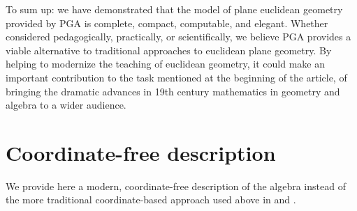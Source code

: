 \documentclass{birkjour}
\newcommand{\fvsh}[2]{\ifthenelse{\equal{\isFV}{true}}{#1}{#2}}
\begin{document}
To sum up:  we have demonstrated that the model of plane euclidean geometry provided by PGA is complete, compact, computable, and elegant.  Whether considered pedagogically, practically, or scientifically, we believe PGA provides a viable alternative to traditional approaches to euclidean plane geometry.   By helping to modernize the teaching of euclidean geometry, it could make an important contribution to the task mentioned at the beginning of the article, of bringing the dramatic advances in 19th century mathematics in geometry and algebra to a wider audience.  




\appendix
\renewcommand{\appendixtocname}{Appendix}
\appendixpage
\section{Coordinate-free description}
\label{sec:cfd}
We provide here a modern, coordinate-free description of the algebra instead of the more traditional coordinate-based approach used above in  and .  %
\end{document}
